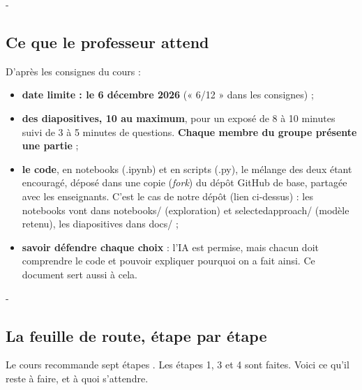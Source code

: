 \documentclass[10pt,a4paper]{article}
\makeatletter
\newcommand{\besoin}[1]{\par\penalty-100\begingroup\setlength{\dimen@}{#1}%
  \dimen@ii\pagegoal\advance\dimen@ii-\pagetotal
  \ifdim\dimen@>\dimen@ii\ifdim\dimen@ii>\z@\vfil\fi\break\fi\endgroup}
\let\soussectionorigine\subsection
\renewcommand{\subsection}{\besoin{5\baselineskip}\soussectionorigine}
\newcommand{\coupure}{\textunderscore\allowbreak}
\newcommand{\fic}[1]{{\small\ttfamily\let\_\coupure #1}}
\makeatother
\begin{document}
\subsection{Ce que le professeur attend}
D'après les consignes du cours \cite{cours6} :
\begin{itemize}[nosep]
\item \textbf{date limite : le 6 décembre 2026} (« 6/12 » dans les consignes) ;
\item \textbf{des diapositives, 10 au maximum}, pour un exposé de 8 à 10 minutes suivi de 3 à 5 minutes de questions. \textbf{Chaque membre du groupe présente une partie} ;
\item \textbf{le code}, en notebooks (\fic{.ipynb}) et en scripts (\fic{.py}), le mélange des deux étant encouragé, déposé dans une copie (\emph{fork}) du dépôt GitHub de base, partagée avec les enseignants. C'est le cas de notre dépôt (lien ci-dessus) : les notebooks vont dans \fic{notebooks/} (exploration) et \fic{selected\_approach/} (modèle retenu), les diapositives dans \fic{docs/} ;
\item \textbf{savoir défendre chaque choix} : l'IA est permise, mais chacun doit comprendre le code et pouvoir expliquer pourquoi on a fait ainsi. Ce document sert aussi à cela.
\end{itemize}

\subsection{La feuille de route, étape par étape}
Le cours recommande sept étapes \cite{cours6}. Les étapes 1, 3 et 4 sont faites. Voici ce qu'il reste à faire, et à quoi s'attendre.
\end{document}
